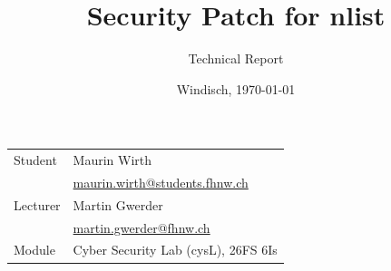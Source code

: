 \documentclass[final]{fhnwreport}         %
\title{Security Patch for nlist}  %
\author{Technical Report}    %
\date{Windisch, \today}                    %
\begin{document}

\maketitle

\vfill

\begin{tabular}{@{}p{5cm} l}
Student                    &    Maurin Wirth\\
                           &    \href{mailto:maurin.wirth@students.fhnw.ch}{maurin.wirth@students.fhnw.ch}\\[2ex]
Lecturer                   &    Martin Gwerder\\
                           &    \href{mailto:martin.gwerder@fhnw.ch}{martin.gwerder@fhnw.ch}\\[2ex]
Module                     &    Cyber Security Lab (cysL), 26FS 6Is\\[4ex]

\end{tabular}

\vspace*{4ex}

\clearpage
			
\thispagestyle{empty}


\tableofcontents
\clearpage





\nocite{*}
{\sloppypar
\printbibliography[heading=bibintoc, title=References]
}

\begin{appendix}

\end{appendix}

\end{document}
